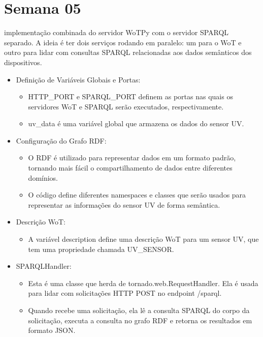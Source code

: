 \section{Semana 05}


implementação combinada do servidor WoTPy com o servidor SPARQL separado. A ideia é ter dois serviços rodando em paralelo: um para o WoT e outro para lidar com consultas SPARQL relacionadas aos dados semânticos dos dispositivos.

\begin{itemize}
    \item Definição de Variáveis Globais e Portas:
        \begin{itemize}
            \item HTTP\_PORT e SPARQL\_PORT definem as portas nas quais os servidores WoT e SPARQL serão executados, respectivamente.
            \item uv\_data é uma variável global que armazena os dados do sensor UV.
        \end{itemize}
    \item Configuração do Grafo RDF:
        \begin{itemize}
            \item O RDF é utilizado para representar dados em um formato padrão, tornando mais fácil o compartilhamento de dados entre diferentes domínios.
            \item O código define diferentes namespaces e classes que serão usados para representar as informações do sensor UV de forma semântica.
        \end{itemize}
    \item Descrição WoT:
        \begin{itemize}
            \item A variável description define uma descrição WoT para um sensor UV, que tem uma propriedade chamada UV\_SENSOR.
        \end{itemize}
    \item SPARQLHandler:
        \begin{itemize}
            \item Esta é uma classe que herda de tornado.web.RequestHandler. Ela é usada para lidar com solicitações HTTP POST no endpoint /sparql.
            \item Quando recebe uma solicitação, ela lê a consulta SPARQL do corpo da solicitação, executa a consulta no grafo RDF e retorna os resultados em formato JSON.

\end{itemize}
\end{itemize}
